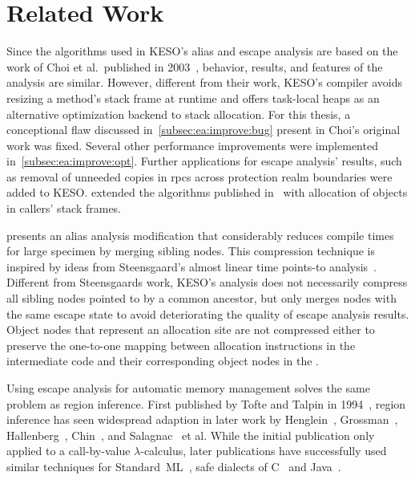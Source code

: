 
\chapter{Related Work}
	\label{chapter:rel}
	Since the algorithms used in KESO's alias and escape analysis are based on the work of Choi et al.\ published in
	2003~\cite{choi:03:toplas}, behavior, results, and features of the analysis are similar. However, different from their
	work, KESO's compiler avoids resizing a method's stack frame at runtime and offers task-local heaps as an alternative
	optimization backend to stack allocation. For this thesis, a conceptional flaw discussed
	in~\cref{subsec:ea:improve:bug} present in Choi's original work was fixed. Several other performance improvements were
	implemented in~\cref{subsec:ea:improve:opt}. Further applications for escape analysis' results, such as removal of
	unneeded copies in \glspl{rpc} across protection realm boundaries were added to KESO.  extended the
	algorithms published in~\cite{choi:03:toplas} with allocation of objects in callers' stack frames.

	 presents an alias analysis modification that considerably reduces compile
	times for large specimen by merging sibling nodes. This compression technique is inspired by ideas from Steensgaard's
	almost linear time points-to analysis~\cite{steensgaard:96:popl}. Different from Steensgaards work, KESO's analysis
	does not necessarily compress all sibling nodes pointed to by a common ancestor, but only merges nodes with the same
	escape state to avoid deteriorating the quality of escape analysis results. Object nodes that represent an allocation
	site are not compressed either to preserve the one-to-one mapping between allocation instructions in the intermediate
	code and their corresponding object nodes in the .

	Using escape analysis for automatic memory management solves the same problem as region inference. First published by
	Tofte and Talpin in 1994~\cite{tofte:94:popl}, region inference has seen widespread adaption in later work by
	Henglein~\cite{henglein:01:ppdp}, Grossman~\cite{grossman:02:pldi}, Hallenberg~\cite{hallenberg:02:sigplan},
	Chin~\cite{chin:04:pldi}, and Salagnac~\cite{salagnac:05:aiool, salagnac:07:rtcsa} et al. While the initial
	publication only applied to a call-by-value $\lambda$-calculus, later publications have successfully used similar
	techniques for Standard~ML~\cite{henglein:01:ppdp, hallenberg:02:sigplan}, safe dialects of C~\cite{grossman:02:pldi}
	and Java~\cite{chin:04:pldi, salagnac:05:aiool, salagnac:07:rtcsa}.

